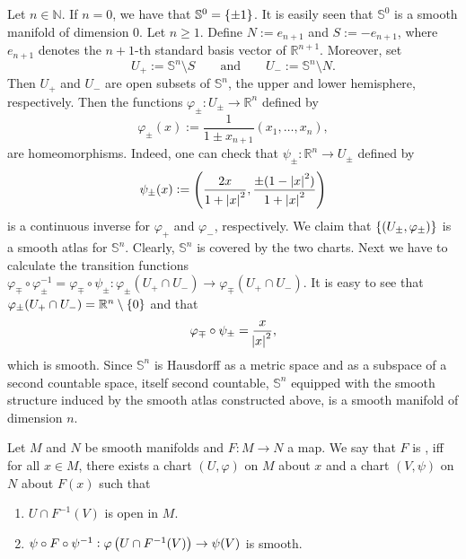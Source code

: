 \begin{example}[$n$-Spheres]
	Let $n \in \mathbb{N}$. If $n = 0$, we have that $\mathbb{S}^0 = \cbr{\pm 1}$. It is easily seen that $\mathbb{S}^0$ is a smooth manifold of dimension $0$. Let $n \geq 1$. Define $N := e_{n + 1}$ and $S := -e_{n + 1}$, where $e_{n + 1}$ denotes the $n + 1$-th standard basis vector of $\mathbb{R}^{n + 1}$. Moreover, set
	\begin{equation*}
		U_+ := \mathbb{S}^n \setminus S \qquad \text{and} \qquad U_- := \mathbb{S}^n \setminus N.
	\end{equation*}
	Then $U_+$ and $U_-$ are open subsets of $\mathbb{S}^n$, the upper and lower hemisphere, respectively. Then the functions $\varphi_\pm : U_\pm \to \mathbb{R}^n$ defined by
	\begin{equation*}
		\varphi_\pm(x) := \frac{1}{1 \pm x_{n + 1}}(x_1,\dots,x_n),
	\end{equation*}
	\noindent are homeomorphisms. Indeed, one can check that $\psi_\pm : \mathbb{R}^n \to U_\pm$ defined by
	\begin{equation*}
		\psi_\pm(x) := \del[4]{\frac{2x}{1 + \abs[0]{x}^2}, \frac{\pm(1 - \abs[0]{x}^2)}{1 + \abs[0]{x}^2}} 
	\end{equation*}
	\noindent is a continuous inverse for $\varphi_+$ and $\varphi_-$, respectively. We claim that $\cbr[0]{(U_\pm,\varphi_\pm)}$ is a smooth atlas for $\mathbb{S}^n$. Clearly, $\mathbb{S}^n$ is covered by the two charts. Next we have to calculate the transition functions $\varphi_\mp \circ \varphi^{-1}_\pm = \varphi_\mp \circ \psi_\pm : \varphi_\pm(U_+ \cap U_-) \to \varphi_\mp(U_+ \cap U_-)$. It is easy to see that $\varphi_\pm(U_+ \cap U_-) = \mathbb{R}^n \setminus \cbr{0}$ and that
	\begin{equation*}
		\varphi_\mp \circ \psi_\pm = \frac{x}{\abs{x}^2},
	\end{equation*}
	\noindent which is smooth. Since $\mathbb{S}^n$ is Hausdorff as a metric space and as a subspace of a second countable space, itself second countable, $\mathbb{S}^n$ equipped with the smooth structure induced by the smooth atlas constructed above, is a smooth manifold of dimension $n$.
\end{example}

\begin{definition}
	Let $M$ and $N$ be smooth manifolds and $F : M \to N$ a map. We say that $F$ is , iff for all $x \in M$, there exists a chart $(U,\varphi)$ on $M$ about $x$ and a chart $(V,\psi)$ on $N$ about $F(x)$ such that
	\begin{enumerate}[label = \textup{(\roman*)},leftmargin=*]
		\item $U \cap F^{-1}(V)$ is open in $M$.
		\item $\psi \circ F \circ \psi^{-1} : \varphi\del[1]{U \cap F^{-1}(V)} \to \psi(V)$ is smooth.
	\end{enumerate}
\end{definition}
